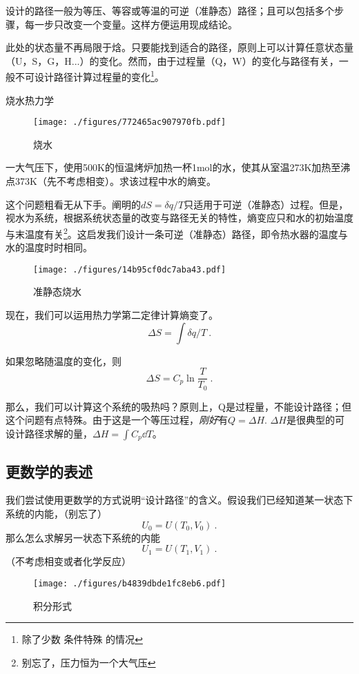 设计的路径一般为等压、等容或等温的可逆（准静态）路径；且可以包括多个步骤，每一步只改变一个变量。这样方便运用现成结论。

此处的状态量不再局限于焓。只要能找到适合的路径，原则上可以计算任意状态量（U，S，G，H...）的变化。然而，由于过程量（Q，W）的变化与路径有关，一般不可设计路径计算过程量的变化\footnote{除了少数 条件特殊 的情况}。

\begin{example}{烧水热力学}
\begin{figure}[ht]
\centering
\texttt{[image: ./figures/772465ac907970fb.pdf]}
\caption{烧水} \label{fig_Hess_3}
\end{figure}
一大气压下，使用500K的恒温烤炉加热一杯1mol的水，使其从室温273K加热至沸点373K（先不考虑相变）。求该过程中水的熵变。

这个问题粗看无从下手。阐明的$dS=\delta q/T$只适用于可逆（准静态）过程。但是，视水为系统，根据系统状态量的改变与路径无关的特性，熵变应只和水的初始温度与末温度有关\footnote{别忘了，压力恒为一个大气压}。这启发我们设计一条可逆（准静态）路径，即令热水器的温度与水的温度时时相同。

\begin{figure}[ht]
\centering
\texttt{[image: ./figures/14b95cf0dc7aba43.pdf]}
\caption{准静态烧水} \label{fig_Hess_4}
\end{figure}
现在，我们可以运用热力学第二定律计算熵变了。
$$\Delta S=\int \delta q/T~.$$

如果忽略随温度的变化，则 
$$\Delta S=C_p \ln \frac{T}{T_0}~.$$

那么，我们可以计算这个系统的吸热吗？原则上，Q是过程量，不能设计路径；但这个问题有点特殊。由于这是一个等压过程，\textsl{刚好}有$Q=\Delta H$. $\Delta H$是很典型的可设计路径求解的量，$\Delta H = \int C_p \dd T$。
\end{example}

\subsection{更数学的表述}
我们尝试使用更数学的方式说明“设计路径”的含义。假设我们已经知道某一状态下系统的内能，（别忘了）
$$U_0=U(T_0,V_0)~.$$
那么怎么求解另一状态下系统的内能
$$U_1=U(T_1,V_1)~.$$
（不考虑相变或者化学反应）

\begin{figure}[ht]
\centering
\texttt{[image: ./figures/b4839dbde1fc8eb6.pdf]}
\caption{积分形式} \label{fig_Hess_5}
\end{figure}

